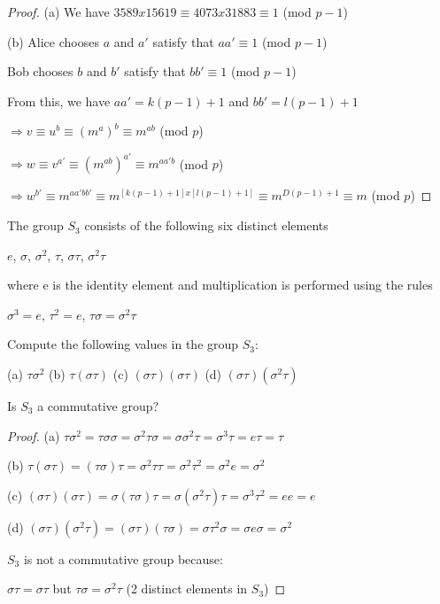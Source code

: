 \begin{proof}

(a) We have $3589x15619 \equiv 4073x31883 \equiv 1$ (mod $p-1$)

(b) Alice chooses $a$ and $a'$ satisfy that $aa' \equiv 1$ (mod $p-1$)

Bob chooses $b$ and $b'$ satisfy that $bb' \equiv 1$ (mod $p-1$)

From this, we have $aa' = k(p-1)+1$ and $bb' = l(p-1) + 1$

$\Rightarrow v \equiv u^b \equiv (m^a)^b \equiv m^{ab}$ (mod $p$)

$\Rightarrow w \equiv v^{a'} \equiv (m^{ab})^{a'} \equiv m^{aa'b}$ (mod $p$)

$\Rightarrow w^{b'} \equiv m^{aa'bb'} \equiv m^{[k(p-1)+1]x[l(p-1)+1]} \equiv m^{D(p-1)+1} \equiv m$ (mod $p$)
\end{proof}

\begin{exer}[2.11]
The group $S_3$ consists of the following six distinct elements

\begin{center}
    $e$, $\sigma$, $\sigma^2$, $\tau$, $\sigma\tau$, $\sigma^2\tau$
\end{center}

where e is the identity element and multiplication is performed using the rules

\begin{center}
    $\sigma^3 = e$, \quad $\tau^2 = e$, \quad $\tau\sigma = \sigma^2\tau$
\end{center}

Compute the following values in the group $S_3$:

(a)  $\tau\sigma^2$ \quad\quad (b)  $\tau(\sigma\tau)$ \quad\quad (c)  $(\sigma\tau)(\sigma\tau)$ \quad\quad (d)  $(\sigma\tau)(\sigma^2\tau)$

Is $S_3$ a commutative group?
\end{exer}

\begin{proof}
(a) $\tau\sigma^2 = \tau\sigma\sigma = \sigma^2\tau\sigma = \sigma\sigma^2\tau = \sigma^3\tau = e\tau = \tau$


(b) $\tau(\sigma\tau)=(\tau\sigma)\tau = \sigma^2\tau\tau = \sigma^2\tau^2 = \sigma^2e = \sigma^2$

(c) $(\sigma\tau)(\sigma\tau) = \sigma(\tau\sigma)\tau=\sigma(\sigma^2\tau)\tau=\sigma^3\tau^2=ee=e$

(d) $(\sigma\tau)(\sigma^2\tau)=(\sigma\tau)(\tau\sigma)=\sigma\tau^2\sigma=\sigma e \sigma = \sigma^2$

$S_3$ is not a commutative group because:

$\sigma\tau = \sigma\tau$ but $\tau\sigma = \sigma^2\tau$ (2 distinct elements in $S_3$)
\end{proof}

